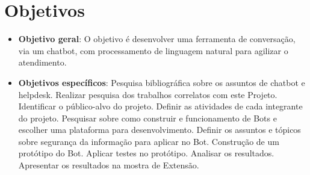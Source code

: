 \section{Objetivos}
\label{objetivos}


\begin{itemize}

\item \textbf{Objetivo geral}: O objetivo é desenvolver uma ferramenta de conversação, via um chatbot, com processamento de linguagem natural para agilizar o atendimento. 
		
\item \textbf{Objetivos específicos}: Pesquisa bibliográfica sobre os assuntos de chatbot e helpdesk.
Realizar pesquisa dos trabalhos correlatos com este Projeto.
Identificar o público-alvo do projeto.
Definir as atividades de cada integrante do projeto.
Pesquisar sobre como construir e funcionamento de Bots e escolher uma plataforma
para desenvolvimento.
Definir os assuntos e tópicos sobre segurança da informação para aplicar no Bot.
Construção de um protótipo do Bot.
Aplicar testes no protótipo.
Analisar os resultados.
Apresentar os resultados na mostra de Extensão.
\end{itemize}
